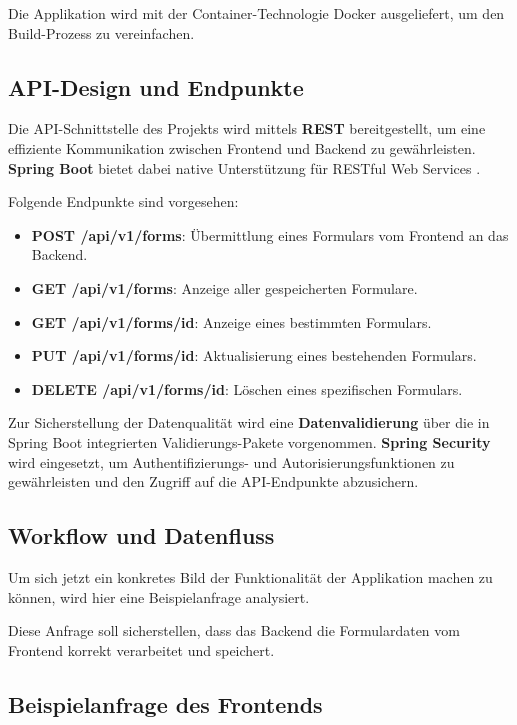 Die Applikation wird mit der Container-Technologie Docker \cite{website-docker} ausgeliefert, um den Build-Prozess zu vereinfachen.

\subsection{API-Design und Endpunkte}

Die API-Schnittstelle des Projekts wird mittels \textbf{REST} bereitgestellt, um eine effiziente Kommunikation zwischen Frontend und Backend zu gewährleisten. \textbf{Spring Boot} bietet dabei native Unterstützung für RESTful Web Services \cite{website-spring_rest}.

Folgende Endpunkte sind vorgesehen:
\begin{itemize}
	\item \textbf{POST /api/v1/forms}: Übermittlung eines Formulars vom Frontend an das Backend.
	\item 	\textbf{GET /api/v1/forms}: Anzeige aller gespeicherten Formulare.
	\item \textbf{GET /api/v1/forms/{id}}: Anzeige eines bestimmten Formulars.
	\item \textbf{PUT /api/v1/forms/{id}}: Aktualisierung eines bestehenden Formulars.
	\item \textbf{DELETE /api/v1/forms/{id}}: Löschen eines spezifischen Formulars.
\end{itemize}

Zur Sicherstellung der Datenqualität wird eine \textbf{Datenvalidierung} über die in Spring Boot integrierten Validierungs-Pakete vorgenommen. \textbf{Spring Security}\cite{website-spring_security} wird eingesetzt, um Authentifizierungs- und Autorisierungsfunktionen zu gewährleisten und den Zugriff auf die API-Endpunkte abzusichern.


\subsection{Workflow und Datenfluss}

Um sich jetzt ein konkretes Bild der Funktionalität der Applikation machen zu können, wird hier eine Beispielanfrage analysiert. 

Diese Anfrage soll sicherstellen, dass das Backend die Formulardaten vom Frontend korrekt verarbeitet und speichert.

\newpage

\subsection{Beispielanfrage des Frontends}


